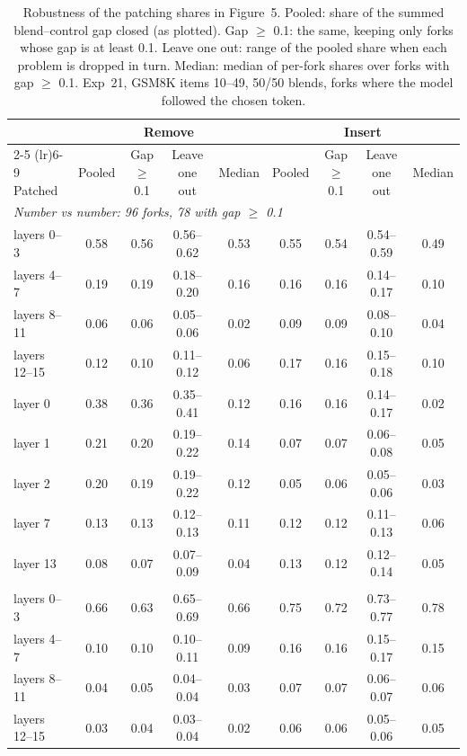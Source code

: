 \begin{table}[t]
\centering
\small
\caption{Robustness of the patching shares in Figure~5. Pooled: share of the summed blend--control gap closed (as plotted). Gap $\geq$ 0.1: the same, keeping only forks whose gap is at least 0.1. Leave one out: range of the pooled share when each problem is dropped in turn. Median: median of per-fork shares over forks with gap $\geq$ 0.1. Exp~21, GSM8K items 10--49, 50/50 blends, forks where the model followed the chosen token.}
\label{tab:fig5-robust}
\begin{tabular}{lcccccccc}
\toprule
 & \multicolumn{4}{c}{Remove} & \multicolumn{4}{c}{Insert} \\
\cmidrule(lr){2-5} \cmidrule(lr){6-9}
Patched & Pooled & Gap $\geq$ 0.1 & Leave one out & Median & Pooled & Gap $\geq$ 0.1 & Leave one out & Median \\
\midrule
\multicolumn{9}{l}{\emph{Number vs number: 96 forks, 78 with gap $\geq$ 0.1}} \\
layers 0--3 & 0.58 & 0.56 & 0.56--0.62 & 0.53 & 0.55 & 0.54 & 0.54--0.59 & 0.49 \\
layers 4--7 & 0.19 & 0.19 & 0.18--0.20 & 0.16 & 0.16 & 0.16 & 0.14--0.17 & 0.10 \\
layers 8--11 & 0.06 & 0.06 & 0.05--0.06 & 0.02 & 0.09 & 0.09 & 0.08--0.10 & 0.04 \\
layers 12--15 & 0.12 & 0.10 & 0.11--0.12 & 0.06 & 0.17 & 0.16 & 0.15--0.18 & 0.10 \\
layer 0 & 0.38 & 0.36 & 0.35--0.41 & 0.12 & 0.16 & 0.16 & 0.14--0.17 & 0.02 \\
layer 1 & 0.21 & 0.20 & 0.19--0.22 & 0.14 & 0.07 & 0.07 & 0.06--0.08 & 0.05 \\
layer 2 & 0.20 & 0.19 & 0.19--0.22 & 0.12 & 0.05 & 0.06 & 0.05--0.06 & 0.03 \\
layer 7 & 0.13 & 0.13 & 0.12--0.13 & 0.11 & 0.12 & 0.12 & 0.11--0.13 & 0.06 \\
layer 13 & 0.08 & 0.07 & 0.07--0.09 & 0.04 & 0.13 & 0.12 & 0.12--0.14 & 0.05 \\
\addlinespace
\multicolumn{9}{l}{\emph{Word vs word: 139 forks, 108 with gap $\geq$ 0.1}} \\
layers 0--3 & 0.66 & 0.63 & 0.65--0.69 & 0.66 & 0.75 & 0.72 & 0.73--0.77 & 0.78 \\
layers 4--7 & 0.10 & 0.10 & 0.10--0.11 & 0.09 & 0.16 & 0.16 & 0.15--0.17 & 0.15 \\
layers 8--11 & 0.04 & 0.05 & 0.04--0.04 & 0.03 & 0.07 & 0.07 & 0.06--0.07 & 0.06 \\
layers 12--15 & 0.03 & 0.04 & 0.03--0.04 & 0.02 & 0.06 & 0.06 & 0.05--0.06 & 0.05 \\
\bottomrule
\end{tabular}
\end{table}
